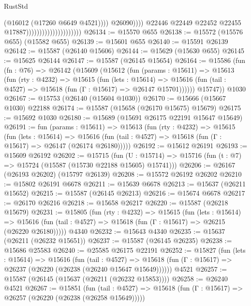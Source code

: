 \begin{lexlean}{RustStd}
\begin{coremodule}
                                                          (@16012 (@17260 @6649 @4521))))
                                                      @26090))))
                                              @22446
                                              @22449
                                              @22452
                                              @22455
                                              @17887)))))))))))))))))))))
@26134 := @15570 @655
@26138 := @15572 (@15576 @655) (@15582 @655)
@26139 := @15601 @655
@26140 := @15591 @26139
@26142 := @15587 (@26140 @15606)
@26144 := @15629 (@15630 @655)
@26145 := @15625 @26144
@26147 := @15587 (@26145 @15654)
@26164 := @15586
    (fun (fn : @76) =>
    @26142
      (@15609
        (@15612
          (fun (params : @15611) =>
          @15613
            (fun (rty : @4232) =>
            @15615
              (fun (lets : @15614) =>
              @15616 (fun (tail : @4527) => @15618 (fun (Γ : @15617) => @26147 @15701))))))
        @15747))
    @1030
@26167 := @15753 (@26140 (@15604 @1030))
@26170 := @15666 (@15667 @1030) @22188
@26174 := @15587 (@15658 (@26170 @15675) @15679)
@26175 := @15692 @1030
@26180 := @15689 (@15691 @26175 @22191 @15647 @15649)
@26191 := fun (params : @15611) =>
  @15613
    (fun (rty : @4232) =>
    @15615
      (fun (lets : @15614) =>
      @15616 (fun (tail : @4527) => @15618 (fun (Γ : @15617) => @26147 (@26174 @26180)))))
@26192 := @15612 @26191
@26193 := @15609 @26192
@26202 := @15715
    (fun (U : @15714) => @15716 (fun (t : @7) => @15724 (@15587 (@15730 @22188 @15605) @15741)))
@26206 := @26167 (@26193 @26202) (@15797 @26139)
@26208 := @15572 @26192 @26202
@26210 := @15802 @26191 @6678
@26211 := @15639 @6678
@26213 := @15637 (@26211 @15652)
@26215 := @15587 (@26145 @26213)
@26216 := @15674 @6678
@26217 := @26170 @26216
@26218 := @15658 @26217
@26220 := @15587 (@26218 @15679)
@26231 := @15805
    (fun (rty : @4232) =>
    @15615
      (fun (lets : @15614) =>
      @15616 (fun (tail : @4527) => @15618 (fun (Γ : @15617) => @26215 (@26220 @26180)))))
    @4340
@26232 := @15643 @4340
@26235 := @15637 (@26211 (@26232 @15651))
@26237 := @15587 (@26145 @26235)
@26238 := @15686 @25583
@26240 := @25585 @26175 @22191
@26252 := @15827
    (fun (lets : @15614) =>
    @15616
      (fun (tail : @4527) =>
      @15618 (fun (Γ : @15617) => @26237 (@26220 (@26238 (@26240 @15647 @15649))))))
    @4521
@26257 := @15587 (@26145 (@15637 (@26211 (@26232 @15853))))
@26258 := @26240 @4521
@26267 := @15851
    (fun (tail : @4527) => @15618 (fun (Γ : @15617) => @26257 (@26220 (@26238 (@26258 @15649)))))

\end{coremodule}
\end{lexlean}
